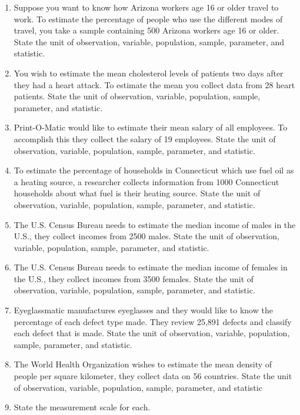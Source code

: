 \documentclass[]{book}
\begin{document}
\begin{enumerate}
\def\labelenumi{\arabic{enumi}.}
\item
  Suppose you want to know how Arizona workers age 16 or older travel to work. To estimate the percentage of people who use the different modes of travel, you take a sample containing 500 Arizona workers age 16 or older. State the unit of observation, variable, population, sample, parameter, and statistic.
\item
  You wish to estimate the mean cholesterol levels of patients two days after they had a heart attack. To estimate the mean you collect data from 28 heart patients. State the unit of observation, variable, population, sample, parameter, and statistic.
\item
  Print-O-Matic would like to estimate their mean salary of all employees. To accomplish this they collect the salary of 19 employees. State the unit of observation, variable, population, sample, parameter, and statistic.
\item
  To estimate the percentage of households in Connecticut which use fuel oil as a heating source, a researcher collects information from 1000 Connecticut households about what fuel is their heating source. State the unit of observation, variable, population, sample, parameter, and statistic.
\item
  The U.S. Census Bureau needs to estimate the median income of males in the U.S., they collect incomes from 2500 males. State the unit of observation, variable, population, sample, parameter, and statistic.
\item
  The U.S. Census Bureau needs to estimate the median income of females in the U.S., they collect incomes from 3500 females. State the unit of observation, variable, population, sample, parameter, and statistic.
\item
  Eyeglassmatic manufactures eyeglasses and they would like to know the percentage of each defect type made. They review 25,891 defects and classify each defect that is made. State the unit of observation, variable, population, sample, parameter, and statistic.
\item
  The World Health Organization wishes to estimate the mean density of people per square kilometer, they collect data on 56 countries. State the unit of observation, variable, population, sample, parameter, and statistic
\item
  State the measurement scale for each.
\end{enumerate}
\end{document}
